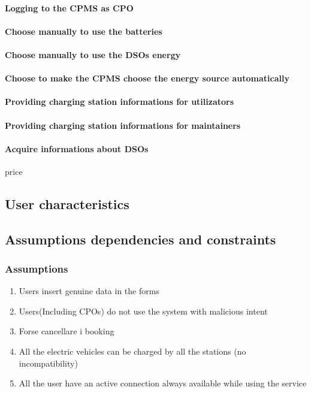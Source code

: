 \paragraph{Logging to the \ac{CPMS} as \ac{CPO}}
\paragraph{Choose manually to use the batteries}
\paragraph{Choose manually to use the \acp{DSO} energy}
\paragraph{Choose to make the \ac{CPMS} choose the energy source automatically}
\paragraph{Providing charging station informations for utilizators}
\paragraph{Providing charging station informations for maintainers}
\paragraph{Acquire informations about \acp{DSO}}
price



\subsection{User characteristics}

\subsection{Assumptions dependencies and constraints}
\subsubsection{Assumptions}
\begin{enumerate}[label=DA\arabic*]
      \item Users insert genuine data in the forms
      \item Users(Including CPOs) do not use the system with malicious intent
      \item Forse cancellare i booking
      \item All the electric vehicles can be charged by all the stations (no incompatibility)
      \item All the user have an active connection always available while using the service
\end{enumerate}
\clearpage